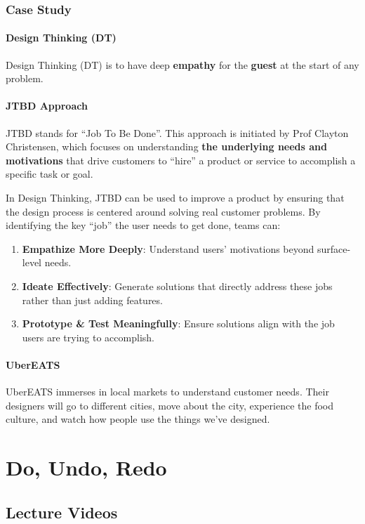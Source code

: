 \documentclass[math,code]{amznotes}
\theoremstyle{remark}
\begin{document}
\subsection{Case Study}
\subsubsection{Design Thinking (DT)}
Design Thinking (DT) is to have deep \textbf{empathy} for the \textbf{guest} at the start of any problem.

\subsubsection{JTBD Approach}
JTBD stands for ``Job To Be Done''. This approach is initiated by Prof Clayton Christensen, which focuses on understanding \textbf{the underlying needs and motivations} that drive customers to ``hire'' a product or service to accomplish a specific task or goal.

In Design Thinking, JTBD can be used to improve a product by ensuring that the design process is centered around solving real customer problems. By identifying the key ``job'' the user needs to get done, teams can:
\begin{enumerate}
    \item \textbf{Empathize More Deeply}: Understand users’ motivations beyond surface-level needs.
    \item \textbf{Ideate Effectively}: Generate solutions that directly address these jobs rather than just adding features.
    \item \textbf{Prototype \& Test Meaningfully}: Ensure solutions align with the job users are trying to accomplish.
\end{enumerate}

\subsubsection{UberEATS}
UberEATS immerses in local markets to understand customer needs. Their designers will go to different cities, move about the city, experience the food culture, and watch how people use the things we’ve designed.

\chapter{Do, Undo, Redo}
\section{Lecture Videos}
\end{document}
